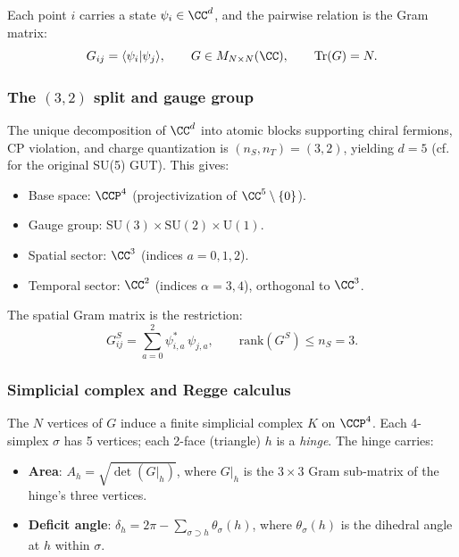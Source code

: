 Each point $i$ carries a state $\psi_i \in \CC^d$, and the
pairwise relation is the Gram matrix:
\begin{equation}
G_{ij} = \langle \psi_i | \psi_j \rangle, \qquad
G \in M_{N \times N}(\CC), \qquad
\mathrm{Tr}(G) = N.
\end{equation}

\subsubsection{The $(3,2)$ split and gauge group}

The unique decomposition of $\CC^d$ into atomic blocks supporting
chiral fermions, CP violation, and charge quantization is
$(n_S, n_T) = (3, 2)$, yielding $d = 5$ 
(cf.\ \cite{GeorgiGlashow} for the original SU(5) GUT). This gives:

\begin{itemize}
\item Base space: $\CCP^4$ (projectivization of
  $\CC^5 \setminus \{0\}$).
\item Gauge group: $\mathrm{SU}(3) \times \mathrm{SU}(2) \times
  \mathrm{U}(1)$.
\item Spatial sector: $\CC^3$ (indices $a = 0, 1, 2$).
\item Temporal sector: $\CC^2$ (indices $\alpha = 3, 4$),
  orthogonal to $\CC^3$.
\end{itemize}

The spatial Gram matrix is the restriction:
\begin{equation}
G^S_{ij} = \sum_{a=0}^{2} \psi^*_{i,a}\, \psi_{j,a}, \qquad
\mathrm{rank}(G^S) \leq n_S = 3.
\label{eq:GS}
\end{equation}

\subsubsection{Simplicial complex and Regge calculus}

The $N$ vertices of $G$ induce a finite simplicial complex $K$ on
$\CCP^4$. Each 4-simplex $\sigma$ has 5 vertices; each 2-face
(triangle) $h$ is a \emph{hinge}. The hinge carries:

\begin{itemize}
\item \textbf{Area}: $A_h = \sqrt{\det(G|_h)}$, where $G|_h$ is the
  $3 \times 3$ Gram sub-matrix of the hinge's three vertices.
\item \textbf{Deficit angle}: $\delta_h = 2\pi -
  \sum_{\sigma \supset h} \theta_\sigma(h)$, where $\theta_\sigma(h)$
  is the dihedral angle at $h$ within $\sigma$.
\end{itemize}

